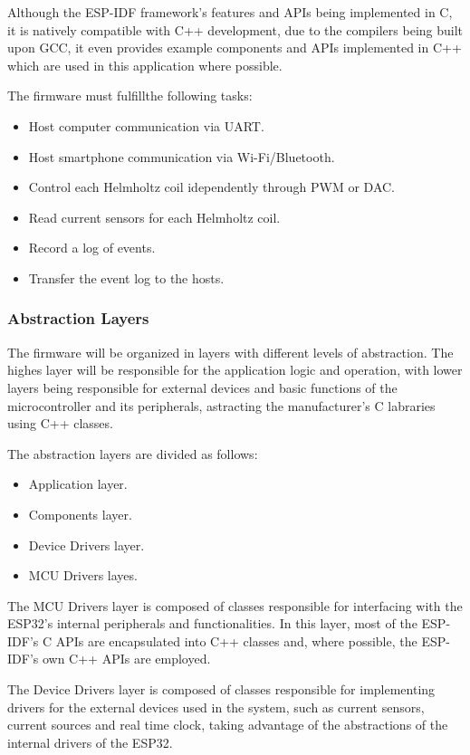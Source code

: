\documentclass[10pt,twocolumn,letterpaper]{article}
\begin{document}
Although the ESP-IDF framework's features and APIs being implemented in C, it is natively compatible with C++ development, due to the compilers being built upon GCC, it even provides example components and APIs implemented in C++ which are used in this application where possible.

The firmware must fulfillthe following tasks:
\begin{itemize}
  \item Host computer communication via UART.
  \item Host smartphone communication via Wi-Fi/Bluetooth.
  \item Control each Helmholtz coil idependently through PWM or DAC.
  \item Read current sensors for each Helmholtz coil.
  \item Record a log of events.
  \item Transfer the event log to the hosts.
\end{itemize}

\subsubsection{Abstraction Layers}

The firmware will be organized in layers with different levels of abstraction. The highes layer will be responsible for the application logic and operation, with lower layers being responsible for external devices and basic functions of the microcontroller and its peripherals, astracting the manufacturer's C labraries using C++ classes.

The abstraction layers are divided as follows:
\begin{itemize}
  \item Application layer.
  \item Components layer.
  \item Device Drivers layer.
  \item MCU Drivers layes.
\end{itemize}

The MCU Drivers layer is composed of classes responsible for interfacing with the ESP32's internal peripherals and functionalities.
In this layer, most of the ESP-IDF's C APIs are encapsulated into C++ classes and, where possible, the ESP-IDF's own C++ APIs are employed.

The Device Drivers layer is composed of classes responsible for implementing drivers for the external devices used in the system, such as current sensors, current sources and real time clock, taking advantage of the abstractions of the internal drivers of the ESP32.
\end{document}
